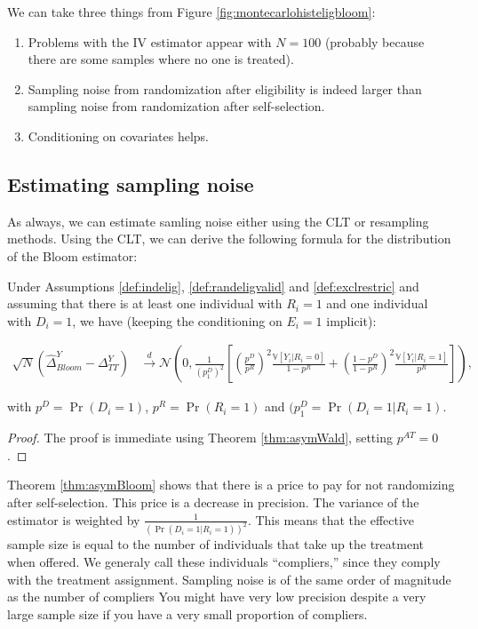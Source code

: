 \documentclass[]{book}
\providecommand{\tightlist}{%
  \setlength{\itemsep}{0pt}\setlength{\parskip}{0pt}}
\newcommand{\var}[1]{\mathbb{V}[ #1 ]}
\theoremstyle{definition}
\theoremstyle{definition}
\theoremstyle{definition}
\theoremstyle{remark}
\let\BeginKnitrBlock\begin \let\EndKnitrBlock\end
\begin{document}
We can take three things from Figure \ref{fig:montecarlohisteligbloom}:

\begin{enumerate}
\def\labelenumi{\arabic{enumi}.}
\tightlist
\item
  Problems with the IV estimator appear with \(N=100\) (probably because
  there are some samples where no one is treated).
\item
  Sampling noise from randomization after eligibility is indeed larger
  than sampling noise from randomization after self-selection.
\item
  Conditioning on covariates helps.
\end{enumerate}

\subsection{Estimating sampling
noise}\label{estimating-sampling-noise-2}

As always, we can estimate samling noise either using the CLT or
resampling methods. Using the CLT, we can derive the following formula
for the distribution of the Bloom estimator:

\BeginKnitrBlock{theorem}[Asymptotic Distribution of $\hat{\Delta}^Y_{Bloom}$]
\protect\hypertarget{thm:asymBloom}{}{\label{thm:asymBloom}
\iffalse (Asymptotic Distribution of \(\hat{\Delta}^Y_{Bloom}\)) \fi{}
}Under Assumptions \ref{def:indelig}, \ref{def:randeligvalid} and
\ref{def:exclrestric} and assuming that there is at least one individual
with \(R_i=1\) and one individual with \(D_i=1\), we have (keeping the
conditioning on \(E_i=1\) implicit):

\begin{align*}
  \sqrt{N}(\hat{\Delta}^Y_{Bloom}-\Delta^Y_{TT}) &  \stackrel{d}{\rightarrow}
  \mathcal{N}\left(0,\frac{1}{(p^{D}_1)^2}\left[\left(\frac{p^D}{p^R}\right)^2\frac{\var{Y_i|R_i=0}}{1-p^R}+\left(\frac{1-p^D}{1-p^R}\right)^2\frac{\var{Y_i|R_i=1}}{p^R}\right]\right),
\end{align*}
\EndKnitrBlock{theorem}

with \(p^D=\Pr(D_i=1)\), \(p^R=\Pr(R_i=1)\) and
\((p^{D}_1=\Pr(D_i=1|R_i=1)\).

\BeginKnitrBlock{proof}
\iffalse{} {Proof. } \fi{}The proof is immediate using Theorem
\ref{thm:asymWald}, setting \(p^{AT}=0\).
\EndKnitrBlock{proof}

\BeginKnitrBlock{remark}
\iffalse{} {Remark. } \fi{}Theorem \ref{thm:asymBloom} shows that there
is a price to pay for not randomizing after self-selection. This price
is a decrease in precision. The variance of the estimator is weighted by
\(\frac{1}{(\Pr(D_i=1|R_i=1))^2}\). This means that the effective sample
size is equal to the number of individuals that take up the treatment
when offered. We generaly call these individuals ``compliers,'' since
they comply with the treatment assignment. Sampling noise is of the same
order of magnitude as the number of compliers You might have very low
precision despite a very large sample size if you have a very small
proportion of compliers.
\EndKnitrBlock{remark}
\end{document}
